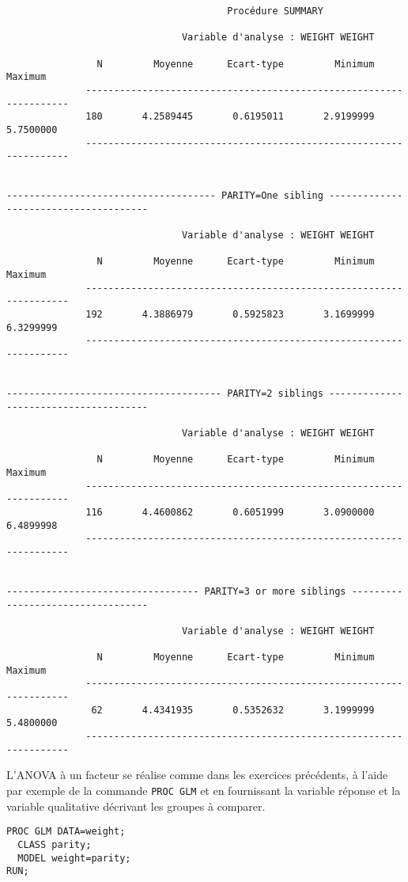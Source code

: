 \begin{verbatim}
                                       Procédure SUMMARY

                               Variable d'analyse : WEIGHT WEIGHT

                N         Moyenne      Ecart-type         Minimum         Maximum
              -------------------------------------------------------------------
              180       4.2589445       0.6195011       2.9199999       5.7500000
              -------------------------------------------------------------------


------------------------------------- PARITY=One sibling --------------------------------------

                               Variable d'analyse : WEIGHT WEIGHT

                N         Moyenne      Ecart-type         Minimum         Maximum
              -------------------------------------------------------------------
              192       4.3886979       0.5925823       3.1699999       6.3299999
              -------------------------------------------------------------------


-------------------------------------- PARITY=2 siblings --------------------------------------

                               Variable d'analyse : WEIGHT WEIGHT

                N         Moyenne      Ecart-type         Minimum         Maximum
              -------------------------------------------------------------------
              116       4.4600862       0.6051999       3.0900000       6.4899998
              -------------------------------------------------------------------


---------------------------------- PARITY=3 or more siblings ----------------------------------

                               Variable d'analyse : WEIGHT WEIGHT

                N         Moyenne      Ecart-type         Minimum         Maximum
              -------------------------------------------------------------------
               62       4.4341935       0.5352632       3.1999999       5.4800000
              -------------------------------------------------------------------
\end{verbatim}

L'ANOVA à un facteur se réalise comme dans les exercices précédents, à
l'aide par exemple de la commande \texttt{PROC GLM} et en fournissant la
variable réponse et la variable qualitative décrivant les groupes à
comparer.
\begin{verbatim}
PROC GLM DATA=weight; 
  CLASS parity; 
  MODEL weight=parity; 
RUN;
\end{verbatim}

